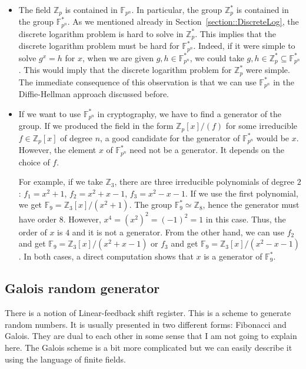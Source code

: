 \begin{remarks}
\begin{itemize}
\item 
The field $\mathbb Z_p$ is contained in $\mathbb F_{p^n}$.
In particular, the group $\mathbb Z_p^*$ is contained in the group $\mathbb F_{p^n}^*$.
As we mentioned already in Section~\ref{section::DiscreteLog}, the discrete logarithm problem is hard to solve in $\mathbb Z_p^*$.
This implies that the discrete logarithm problem must be hard for $\mathbb F_{p^n}^*$.
Indeed, if it were simple to solve $g^x = h$ for $x$, when we are given $g,h \in \mathbb F_{p^n}^*$, we could take $g, h\in \mathbb Z_p^* \subseteq \mathbb F_{p^n}^*$.
This would imply that the discrete logarithm problem for $\mathbb Z_p^*$ were simple.
The immediate consequence of this observation is that we can use $\mathbb F_{p^n}^*$ in the Diffie-Hellman approach discussed before.

\item
If we want to use $\mathbb F_{p^n}^*$ in cryptography, we have to find a generator of the group.
If we produced the field in the form $\mathbb Z_p[x]/(f)$ for some irreducible $f\in \mathbb Z_p[x]$ of degree $n$, a good candidate for the generator of $\mathbb F_{p^n}^*$ would be $x$.
However, the element $x$ of $\mathbb F_{p^n}^*$ need not be a generator.
It depends on the choice of $f$.

For example, if we take $\mathbb Z_3$, there are three irreducible polynomials of degree $2$: $f_1 = x^2+1$, $f_2 = x^2 + x - 1$, $f_3 = x^2 - x - 1$.
If we use the first polynomial, we get $\mathbb F_9 = \mathbb Z_3[x]/(x^2 + 1)$.
The group $\mathbb F_9^* \simeq \mathbb Z_8$, hence the generator must have order $8$.
However, $x^4 = (x^2)^2=(-1)^2 = 1$ in this case.
Thus, the order of $x$ is $4$ and it is not a generator.
From the other hand, we can use $f_2$ and get $\mathbb F_9 = \mathbb Z_3[x]/(x^2+x-1)$ or $f_3$ and get  $\mathbb F_9 = \mathbb Z_3[x]/(x^2-x-1)$.
In both cases, a direct computation shows that $x$ is a generator of $\mathbb F_9^*$.
\end{itemize}
\end{remarks}

\subsection{Galois random generator}

There is a notion of Linear-feedback shift register.
This is a scheme to generate random numbers.
It is usually presented in two different forms: Fibonacci and Galois.
They are dual to each other in some sense that I am not going to explain here.
The Galois scheme is a bit more complicated but we can easily describe it using the language of finite fields.

